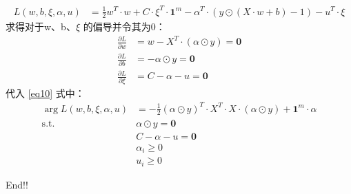 \documentclass[12pt, a4paper, oneside]{ctexart}
\begin{document}
\begin{align}
    L(w, b, \xi, {\alpha}, u) &= \frac{1}{2}w^T \cdot w + C \cdot \xi^T \cdot\boldsymbol{1}^m   - {\alpha} ^T \cdot  (y \odot (X \cdot w + b) - 1) - u^T \cdot \xi  \label{eq10} 
\end{align}
求得对于w、b、$\xi$ 的偏导并令其为0：
\begin{align}
    \frac{\partial L}{\partial w} &= w - X^T\cdot(\alpha \odot y) = \boldsymbol{0} \nonumber \\
    \frac{\partial L}{\partial b} &= - \alpha \odot y  = \boldsymbol{0} \nonumber  \\
    \frac{\partial L}{\partial \xi} &= C - \alpha - u  = \boldsymbol{0} \nonumber 
\end{align}
代入 \eqref{eq10} 式中： 
\begin{align}
    \mathop{\arg\max_{\alpha}}  L(w, b, \xi, {\alpha}, u) &= -\frac{1}{2}(\alpha \odot y)^T \cdot X^T \cdot X \cdot (\alpha \odot y) + \boldsymbol{1}^m \cdot \alpha \label{eq11} \\
    \mathrm{ s.t. }\ \   &\alpha \odot y = \boldsymbol{0} \nonumber \\
    &C - \alpha - u \nonumber  = \boldsymbol{0} \nonumber \\
    &\alpha_i \geq 0 \nonumber \\
    &u_i \geq 0 \nonumber 
\end{align}

End!!
\end{document}
